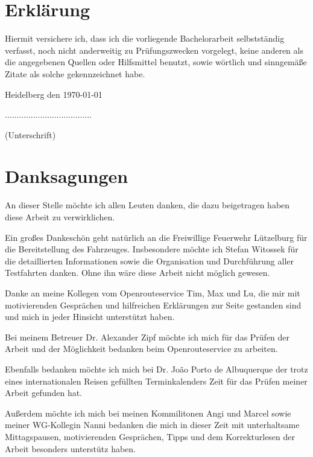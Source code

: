 \newpage
\section*{Erklärung}
\vspace{1cm}
Hiermit versichere ich, dass ich die vorliegende Bachelorarbeit selbstständig verfasst, noch nicht anderweitig zu Prüfungszwecken vorgelegt, keine anderen als die angegebenen Quellen oder Hilfsmittel benutzt, sowie wörtlich und sinngemäße Zitate als solche gekennzeichnet habe.\par
\bigskip

{\flushleft Heidelberg den \today } {\hfill .....................................\par}
{\hfill (Unterschrift)}

\newpage
\section*{Danksagungen}

An dieser Stelle möchte ich allen Leuten danken, die dazu beigetragen haben diese Arbeit zu verwirklichen.\par
\vspace{0.5cm}
Ein großes Dankeschön geht natürlich an die Freiwillige Feuerwehr Lützelburg für die Bereitstellung des Fahrzeuges.
Insbesondere möchte ich Stefan Witossek für die detaillierten Informationen sowie die Organisation und Durchführung aller Testfahrten danken.
Ohne ihn wäre diese Arbeit nicht möglich gewesen.\par
\vspace{0.5cm}
Danke an meine Kollegen vom Openrouteservice Tim, Max und Lu, die mir mit motivierenden Gesprächen und hilfreichen Erklärungen zur Seite gestanden sind und mich in jeder Hinsicht unterstützt haben.\par
\vspace{0.5cm}
Bei meinem Betreuer Dr. Alexander Zipf möchte ich mich für das Prüfen der Arbeit und der Möglichkeit bedanken beim Openrouteservice zu arbeiten.\par
Ebenfalls bedanken möchte ich mich bei Dr. Jo\~ao Porto de Albuquerque der trotz eines internationalen Reisen gefüllten Terminkalenders Zeit für das Prüfen meiner Arbeit gefunden hat.\par
\vspace{0.5cm}
Außerdem möchte ich mich bei meinen Kommilitonen Angi und Marcel sowie meiner WG-Kollegin Nanni bedanken die mich in dieser Zeit mit unterhaltsame Mittagspausen, motivierenden Gesprächen, Tipps und dem Korrekturlesen der Arbeit besonders unterstütz haben.


\newpage
\vspace{1cm}
